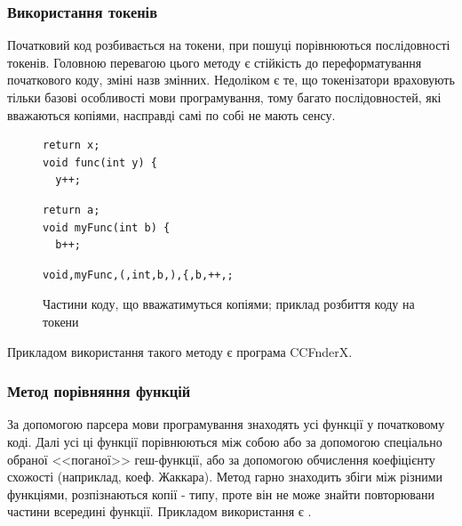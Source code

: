 \documentclass[a4paper, 14pt]{article}
\newcommand{\RNum}[1]{\uppercase\expandafter{\romannumeral #1\relax}}
\begin{document}
\subsubsection{Використання токенів}
Початковий код розбивається на токени, при пошуці порівнюються послідовності токенів.
Головною перевагою цього методу є стійкість до переформатування початкового коду, зміні назв змінних.
Недоліком є те, що токенізатори враховують тільки базові особливості мови програмування, тому багато послідовностей, які вважаються копіями, насправді самі по собі не мають сенсу. \cite{Koschke06}
\begin{figure}[h!]
\centering
\begin{minipage}[t]{.275\textwidth}
\begin{lstlisting}[frame=none]
return x;
void func(int y) {
  y++;
\end{lstlisting}
\end{minipage}
\begin{minipage}[t]{.275\textwidth}
\begin{lstlisting}[frame=none]
return a;
void myFunc(int b) {
  b++;
\end{lstlisting}
\end{minipage}
\begin{minipage}[t]{.35\textwidth}
\begin{lstlisting}[frame=none]
void,myFunc,(,int,b,),{,b,++,;
\end{lstlisting}
\end{minipage}
\caption{Частини коду, що вважатимуться копіями; приклад розбиття коду на токени}
\end{figure}
Прикладом використання такого методу є програма CCFnderX. 
\subsubsection{Метод порівняння функцій}
За допомогою парсера мови програмування знаходять усі функції у початковому коді. Далі усі ці функції порівнюються між собою або за допомогою спеціально обраної <<поганої>> геш-функції, або за допомогою обчислення коефіцієнту схожості (наприклад, коеф. Жаккара).
Метод гарно знаходить збіги між різними функціями, розпізнаються копії \RNum{1}-\RNum{3} типу, проте він не може знайти повторювани частини всередині функції.
Прикладом використання є \cite{Yang18}.
\end{document}
